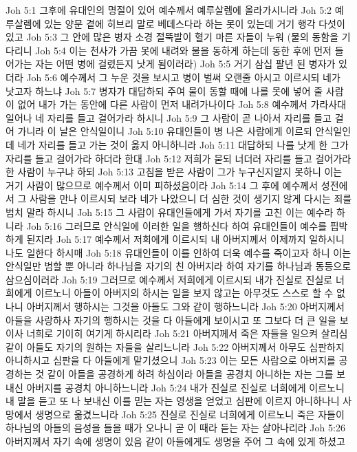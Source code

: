 Joh 5:1  그후에 유대인의 명절이 있어 예수께서 예루살렘에 올라가시니라
Joh 5:2  예루살렘에 있는 양문 곁에 히브리 말로 베데스다라 하는 못이 있는데 거기 행각 다섯이 있고
Joh 5:3  그 안에 많은 병자 소경 절뚝발이 혈기 마른 자들이 누워 (물의 동함을 기다리니
Joh 5:4  이는 천사가 가끔 못에 내려와 물을 동하게 하는데 동한 후에 먼저 들어가는 자는 어떤 병에 걸렸든지 낫게 됨이러라)
Joh 5:5  거기 삼십 팔년 된 병자가 있더라
Joh 5:6  예수께서 그 누운 것을 보시고 병이 벌써 오랜줄 아시고 이르시되 네가 낫고자 하느냐
Joh 5:7  병자가 대답하되 주여 물이 동할 때에 나를 못에 넣어 줄 사람이 없어 내가 가는 동안에 다른 사람이 먼저 내려가나이다
Joh 5:8  예수께서 가라사대 일어나 네 자리를 들고 걸어가라 하시니
Joh 5:9  그 사람이 곧 나아서 자리를 들고 걸어 가니라 이 날은 안식일이니
Joh 5:10  유대인들이 병 나은 사람에게 이르되 안식일인데 네가 자리를 들고 가는 것이 옳지 아니하니라
Joh 5:11  대답하되 나를 낫게 한 그가 자리를 들고 걸어가라 하더라 한대
Joh 5:12  저희가 묻되 너더러 자리를 들고 걸어가라 한 사람이 누구냐 하되
Joh 5:13  고침을 받은 사람이 그가 누구신지알지 못하니 이는 거기 사람이 많으므로 예수께서 이미 피하셨음이라
Joh 5:14  그 후에 예수께서 성전에서 그 사람을 만나 이르시되 보라 네가 나았으니 더 심한 것이 생기지 않게 다시는 죄를 범치 말라 하시니
Joh 5:15  그 사람이 유대인들에게 가서 자기를 고친 이는 예수라 하니라
Joh 5:16  그러므로 안식일에 이러한 일을 행하신다 하여 유대인들이 예수를 핍박하게 된지라
Joh 5:17  예수께서 저희에게 이르시되 내 아버지께서 이제까지 일하시니 나도 일한다 하시매
Joh 5:18  유대인들이 이를 인하여 더욱 예수를 죽이고자 하니 이는 안식일만 범할 뿐 아니라 하나님을 자기의 친 아버지라 하여 자기를 하나님과 동등으로 삼으심이러라
Joh 5:19  그러므로 예수께서 저희에게 이르시되 내가 진실로 진실로 너희에게 이르노니 아들이 아버지의 하시는 일을 보지 않고는 아무것도 스스로 할 수 없나니 아버지께서 행하시는 그것을 아들도 그와 같이 행하느니라
Joh 5:20  아버지께서 아들을 사랑하사 자기의 행하시는 것을 다 아들에게 보이시고 또 그보다 더 큰 일을 보이사 너희로 기이히 여기게 하시리라
Joh 5:21  아버지께서 죽은 자들을 일으켜 살리심 같이 아들도 자기의 원하는 자들을 살리느니라
Joh 5:22  아버지께서 아무도 심판하지 아니하시고 심판을 다 아들에게 맡기셨으니
Joh 5:23  이는 모든 사람으로 아버지를 공경하는 것 같이 아들을 공경하게 하려 하심이라 아들을 공경치 아니하는 자는 그를 보내신 아버지를 공경치 아니하느니라
Joh 5:24  내가 진실로 진실로 너희에게 이르노니 내 말을 듣고 또 나 보내신 이를 믿는 자는 영생을 얻었고 심판에 이르지 아니하나니 사망에서 생명으로 옮겼느니라
Joh 5:25  진실로 진실로 너희에게 이르노니 죽은 자들이 하나님의 아들의 음성을 들을 때가 오나니 곧 이 때라 듣는 자는 살아나리라
Joh 5:26  아버지께서 자기 속에 생명이 있음 같이 아들에게도 생명을 주어 그 속에 있게 하셨고
